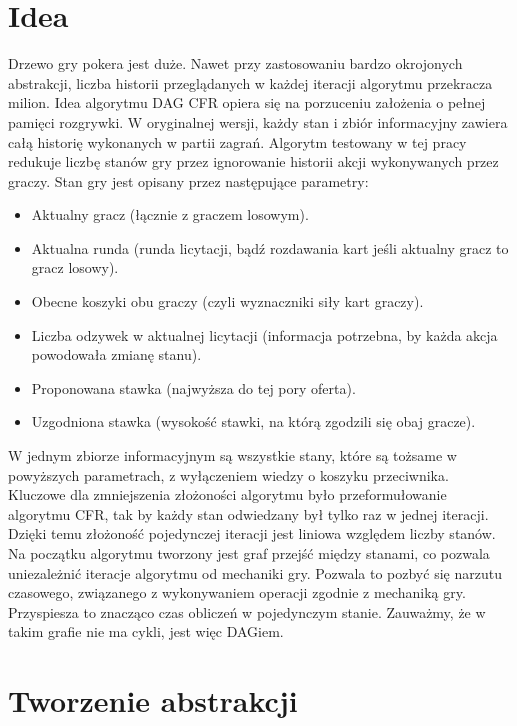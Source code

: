\documentclass[licencjacka]{pracamgr}
\begin{document}
\section{Idea}

Drzewo gry pokera jest duże. Nawet przy zastosowaniu bardzo okrojonych abstrakcji, liczba historii przeglądanych w każdej
iteracji algorytmu przekracza milion. Idea algorytmu DAG CFR opiera się na porzuceniu założenia o pełnej pamięci rozgrywki.
W oryginalnej wersji, każdy stan i zbiór informacyjny zawiera całą historię wykonanych w partii zagrań. Algorytm testowany
w tej pracy redukuje liczbę stanów gry przez ignorowanie historii akcji wykonywanych
przez graczy. Stan gry jest opisany przez następujące parametry: \\

\begin{itemize}
\item Aktualny gracz (łącznie z graczem losowym).
\item Aktualna runda (runda licytacji, bądź rozdawania kart jeśli aktualny gracz to gracz losowy).
\item Obecne koszyki obu graczy (czyli wyznaczniki siły kart graczy).
\item Liczba odzywek w aktualnej licytacji (informacja potrzebna, by każda akcja powodowała zmianę stanu).
\item Proponowana stawka (najwyższa do tej pory oferta).
\item Uzgodniona stawka (wysokość stawki, na którą zgodzili się obaj gracze).
\end{itemize}

\noindent
W jednym zbiorze informacyjnym są wszystkie stany, które są tożsame w powyższych parametrach, z wyłączeniem
wiedzy o koszyku przeciwnika. \\

\noindent
Kluczowe dla zmniejszenia złożoności algorytmu było przeformułowanie algorytmu CFR, tak by każdy
stan odwiedzany był tylko raz w jednej iteracji. Dzięki temu złożoność pojedynczej iteracji jest
liniowa względem liczby stanów. Na początku algorytmu tworzony jest graf przejść między
stanami, co pozwala uniezależnić iteracje algorytmu od mechaniki gry. Pozwala to pozbyć się narzutu czasowego,
związanego z wykonywaniem operacji zgodnie z mechaniką gry. Przyspiesza to znacząco
czas obliczeń w pojedynczym stanie. Zauważmy, że w takim grafie nie ma cykli, jest więc DAGiem.

\section{Tworzenie abstrakcji}
\end{document}
